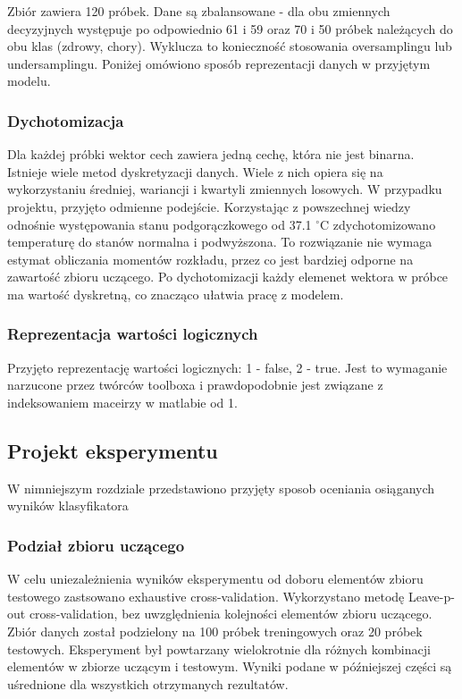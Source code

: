 \documentclass{article}
\begin{document}
Zbiór zawiera 120 próbek. Dane są zbalansowane - dla obu zmiennych decyzyjnych występuje po odpowiednio 61 i 59 oraz 70 i 50 próbek należących do obu klas (zdrowy, chory). Wyklucza to konieczność stosowania oversamplingu lub undersamplingu. Poniżej omówiono sposób reprezentacji danych w przyjętym modelu.

\subsubsection{Dychotomizacja}
Dla każdej próbki wektor cech zawiera jedną cechę, która nie jest binarna. Istnieje wiele metod dyskretyzacji danych. Wiele z nich opiera się na wykorzystaniu średniej, wariancji i kwartyli zmiennych losowych. W przypadku projektu, przyjęto odmienne podejście. Korzystając z powszechnej wiedzy odnośnie występowania stanu podgorączkowego od 37.1 $^{\circ}$C zdychotomizowano temperaturę do stanów normalna i podwyższona. To rozwiązanie nie wymaga estymat obliczania momentów rozkładu, przez co jest bardziej odporne na zawartość zbioru uczącego. Po dychotomizacji każdy elemenet wektora w próbce ma wartość dyskretną, co znacząco ułatwia pracę z modelem.

\subsubsection{Reprezentacja wartości logicznych}
Przyjęto reprezentację wartości logicznych: 1 - false, 2 - true. Jest to wymaganie narzucone przez twórców toolboxa i prawdopodobnie jest związane z indeksowaniem maceirzy w matlabie od 1. 

\subsection{Projekt eksperymentu}
W nimniejszym rozdziale przedstawiono przyjęty sposob oceniania osiąganych wyników klasyfikatora

\subsubsection{Podział zbioru uczącego}

W celu uniezależnienia wyników eksperymentu od doboru elementów zbioru testowego zastsowano exhaustive cross-validation. Wykorzystano metodę Leave-p-out cross-validation, bez uwzględnienia kolejności elementów zbioru uczącego. Zbiór danych został podzielony na 100 próbek treningowych oraz 20 próbek testowych. Eksperyment był powtarzany wielokrotnie dla różnych kombinacji elementów w zbiorze uczącym i testowym. Wyniki podane w późniejszej części są uśrednione dla wszystkich otrzymanych rezultatów.
\end{document}

